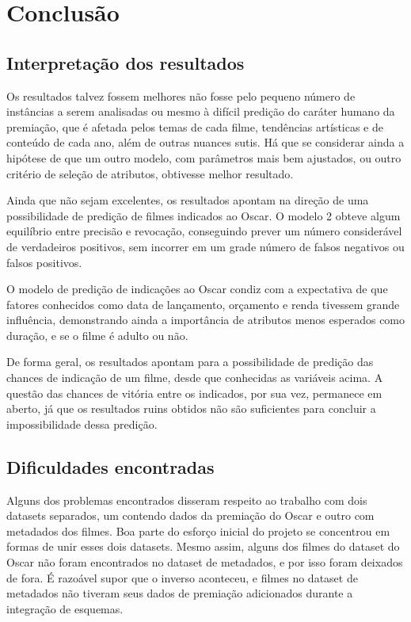 \chapter[Conclusão]{Conclusão}
    \section{Interpretação dos resultados}\par
        Os resultados talvez fossem melhores não fosse pelo pequeno número de instâncias a serem analisadas ou mesmo à difícil predição do caráter humano da premiação, que é afetada pelos temas de cada filme, tendências artísticas e de conteúdo de cada ano, além de outras nuances sutis. Há que se considerar ainda a hipótese de que um outro modelo, com parâmetros mais bem ajustados, ou outro critério de seleção de atributos, obtivesse melhor resultado.
        
        Ainda que não sejam excelentes, os resultados apontam na direção de uma possibilidade de predição de filmes indicados ao Oscar. O modelo 2 obteve algum equilíbrio entre precisão e revocação, conseguindo prever um número considerável de verdadeiros positivos, sem incorrer em um grade número de falsos negativos ou falsos positivos.
        
        O modelo de predição de indicações ao Oscar condiz com a expectativa de que fatores conhecidos como data de lançamento, orçamento e renda tivessem grande influência, demonstrando ainda a importância de atributos menos esperados como duração, e se o filme é adulto ou não.
        
        De forma geral, os resultados apontam para a possibilidade de predição das chances de indicação de um filme, desde que conhecidas as variáveis acima. A questão das chances de vitória entre os indicados, por sua vez, permanece em aberto, já que os resultados ruins obtidos não são suficientes para concluir a impossibilidade dessa predição.

    \section[Dificuldades encontradas]{Dificuldades encontradas}

        Alguns dos problemas encontrados disseram respeito ao trabalho com dois datasets separados, um contendo dados da premiação do Oscar e outro com metadados dos filmes. Boa parte do esforço inicial do projeto se concentrou em formas de unir esses dois datasets. Mesmo assim, alguns dos filmes do dataset do Oscar não foram encontrados no dataset de metadados, e por isso foram deixados de fora. É razoável supor que o inverso aconteceu, e filmes no dataset de metadados não tiveram seus dados de premiação adicionados durante a integração de esquemas.
        
